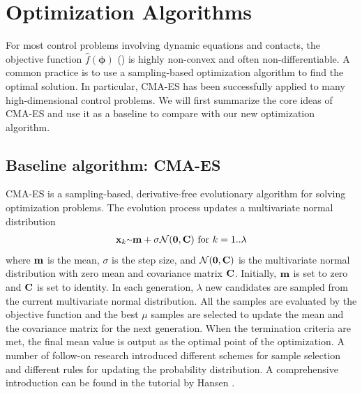 \section{Optimization Algorithms}

For most control problems involving dynamic equations and contacts,
the objective function $\hat{f}(\boldsymbol{\phi})$ ()
is highly non-convex and often non-differentiable.
A common practice is to use a sampling-based
optimization algorithm to find the optimal solution. In particular,
CMA-ES \cite{Hansen:2003:CMA} has been successfully applied to many
  high-dimensional control problems. We will first summarize the core ideas
  of CMA-ES and use it as a baseline to compare with our new optimization algorithm.

\subsection{Baseline algorithm: CMA-ES}
CMA-ES is a sampling-based, derivative-free evolutionary
algorithm for solving optimization problems. The evolution process
updates a multivariate normal distribution 
\begin{equation}
  \begin{aligned}
    \vc{x}_k \mytilde \vc{m} + \sigma \mathcal{N}(\vc{0},
    \mat{C}) \text{ for } k = 1 .. \lambda
  \end{aligned}
\end{equation} 
where $\mathbf{m}$ is the mean, $\sigma$ is the step size, and
$\mathcal{N}(\mathbf{0}, \mathbf{C})$ is the multivariate normal distribution
with zero mean and covariance matrix $\mathbf{C}$. Initially, $\mathbf{m}$ is
set to zero and $\mathbf{C}$ is set to identity. In each generation,
$\lambda$ new candidates are sampled from the current multivariate
normal distribution. All the samples are evaluated by the objective
function and the best $\mu$ samples are selected to update the mean
and the covariance matrix for the next generation. When the
termination criteria are met, the final mean value is output as the
optimal point of the optimization.  A number of follow-on research
introduced different schemes for sample selection and different rules
for updating the probability distribution. A comprehensive
introduction can be found in the tutorial by Hansen \etal \cite{Hansen:2003:CMA}.


